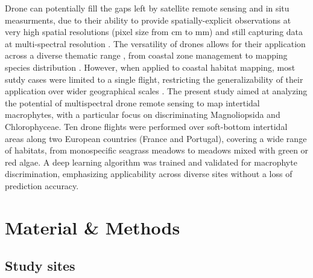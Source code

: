 \documentclass[
  number]{elsarticle}
\begin{document}
Drone can potentially fill the gaps left by satellite remote sensing and
in situ measurments, due to their ability to provide spatially-explicit
observations at very high spatial resolutions (pixel size from cm to mm)
and still capturing data at multi-spectral resolution
\citetext{\citealp[ ]{fairley2022drone}; \citealp{oh2017use}}. The
versatility of drones allows for their application across a diverse
thematic range , from coastal zone management \citetext{\citealp[
]{adade2021}; \citealp[ ]{casella2020}; \citealp{angnuureng2022}} to
mapping species distribution \citetext{\citealp[ ]{joyce2023}; \citealp[
]{tallam2023}; \citealp[ ]{Roca2022}; \citealp[
]{Roman2021}; \citealp{Brunier2022Topographic}}. However, when applied
to coastal habitat mapping, most sutdy cases were limited to a single
flight, restricting the generalizability of their application over wider
geographical scales \citetext{\citealp[ ]{Roman2021}; \citealp[
]{collin2019improving}; \citealp[
]{rossiter2020uav}; \citealp{Brunier2022Topographic}}. The present study
aimed at analyzing the potential of multispectral drone remote sensing
to map intertidal macrophytes, with a particular focus on discriminating
Magnoliopsida and Chlorophyceae. Ten drone flights were performed over
soft-bottom intertidal areas along two European countries (France and
Portugal), covering a wide range of habitats, from monospecific seagrass
meadows to meadows mixed with green or red algae. A deep learning
algorithm was trained and validated for macrophyte discrimination,
emphasizing applicability across diverse sites without a loss of
prediction accuracy.

\section{Material \& Methods}\label{material-methods}

\subsection{Study sites}\label{study-sites}
\end{document}
